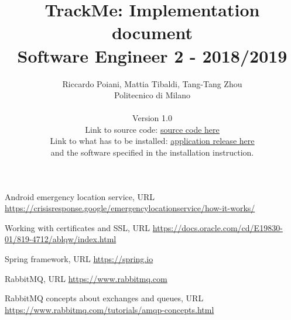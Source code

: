 \documentclass[a4paper]{article}
\begin{document}
\title{TrackMe: Implementation document \\Software Engineer 2 - 2018/2019}
\author{
        Riccardo Poiani, Mattia Tibaldi, Tang-Tang Zhou \\
        Politecnico di Milano\\\\ 
        Version 1.0 \\
        Link to source code:
        \href{https://github.com/tangtang95/PoianiTibaldiZhou/tree/master/Implementation}{\underline{source code here}}\\
	    Link to what has to be installed:
	     \href{https://github.com/tangtang95/PoianiTibaldiZhou/releases}{\underline{application release here}}\\ and the software specified in the installation instruction.\\
}
\maketitle
\newpage
\tableofcontents
\newpage













\newpage

\begin{thebibliography}{9}

Android emergency location service, URL \url{https://crisisresponse.google/emergencylocationservice/how-it-works/}

Working with certificates and SSL, URL \url{https://docs.oracle.com/cd/E19830-01/819-4712/ablqw/index.html}

Spring framework, URL \url{https://spring.io}

RabbitMQ, URL \url{https://www.rabbitmq.com}

RabbitMQ concepts about exchanges and queues, URL \url{https://www.rabbitmq.com/tutorials/amqp-concepts.html}

\end{thebibliography}
\end{document}
